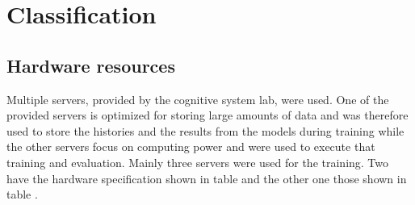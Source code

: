 \chapter{Classification}

\section{Hardware resources}
Multiple servers, provided by the cognitive system lab, were used. One of the provided servers is optimized for storing large amounts of data and was therefore used to store the histories and the results from the models during training while the other servers focus on computing power and were used to execute that training and evaluation. Mainly three servers were used for the training. Two have the hardware specification shown in table  and the other one those shown in table . 


\begin{table}[H]
	\centering
	\caption{add caption}
\end{table}

\begin{table}[H]
	\centering
	\caption{add caption}
\end{table}

